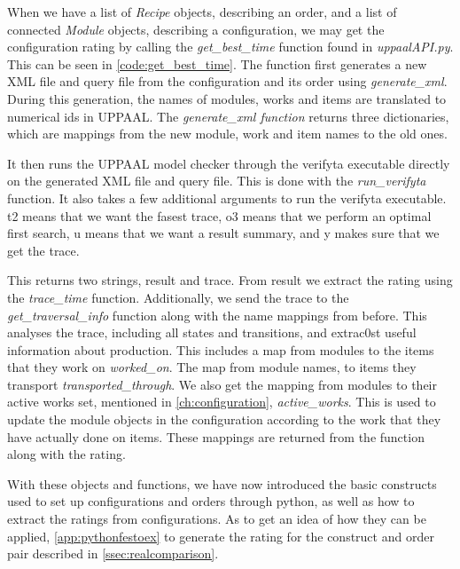  

When we have a list of \textit{Recipe} objects, describing an order, and a list of connected \textit{Module} objects, describing a configuration, we may get the configuration rating by calling the \textit{get\_best\_time} function found in \textit{uppaalAPI.py}. This can be seen in \cref{code:get_best_time}. The function first generates a new XML file and query file from the configuration and its order using \textit{generate\_xml}. During this generation, the names of modules, works and items are translated to numerical ids in UPPAAL. The \textit{generate\_xml function} returns three dictionaries, which are mappings from the new module, work and item names to the old ones.   

It then runs the UPPAAL model checker through the verifyta executable directly on the generated XML file and query file. This is done with the \textit{run\_verifyta} function. It also takes a few additional arguments to run the verifyta executable. t2 means that we want the fasest trace, o3 means that we perform an optimal first search, u means that we want a result summary, and y makes sure that we get the trace.

This returns two strings, result and trace. From result we extract the rating using the \textit{trace\_time} function. Additionally, we send the trace to the \textit{get\_traversal\_info} function along with the name mappings from before. This analyses the trace, including all states and transitions, and extrac0st useful information about production. This includes a map from modules to the items that they work on \textit{worked\_on}. The map from module names, to items they transport \textit{transported\_through}. We also get the mapping from modules to their active works set, mentioned in \cref{ch:configuration}, \textit{active\_works}. This is used to update the module objects in the configuration according to the work that they have actually done on items. These mappings are returned from the function along with the rating.

\begin{minipage}{\linewidth}
  
\end{minipage}

With these objects and functions, we have now introduced the basic constructs used to set up configurations and orders through python, as well as how to extract the ratings from configurations. As to get an idea of how they can be applied, \cref{app:pythonfestoex} to generate the rating for the construct and order pair described in \cref{ssec:realcomparison}.